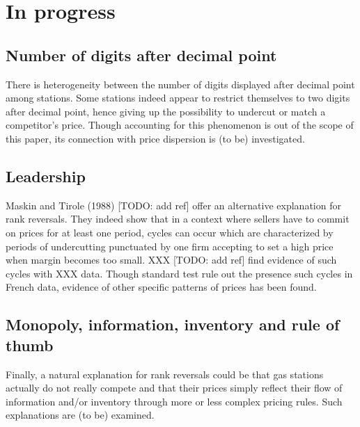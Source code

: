 \documentclass[11pt]{article}
\begin{document}
\section{In progress}

\subsection{Number of digits after decimal point}

There is heterogeneity between the number of digits displayed after decimal point among stations. Some stations indeed appear to restrict themselves to two digits after decimal point, hence giving up the possibility to undercut or match a competitor's price. Though accounting for this phenomenon is out of the scope of this paper, its connection with price dispersion is (to be) investigated.

\subsection{Leadership}

Maskin and Tirole (1988) [TODO: add ref] offer an alternative explanation for rank reversals. They indeed show that in a context where sellers have to commit on prices for at least one period, cycles can occur which are characterized by periods of undercutting punctuated by one firm accepting to set a high price when margin becomes too small. XXX [TODO: add ref] find evidence of such cycles with XXX data. Though standard test rule out the presence such cycles in French data, evidence of other specific patterns of prices has been found.

\subsection{Monopoly, information, inventory and rule of thumb}

Finally, a natural explanation for rank reversals could be that gas stations actually do not really compete and that their prices simply reflect their flow of information and/or inventory through more or less complex pricing rules. Such explanations are (to be) examined.
\end{document}

